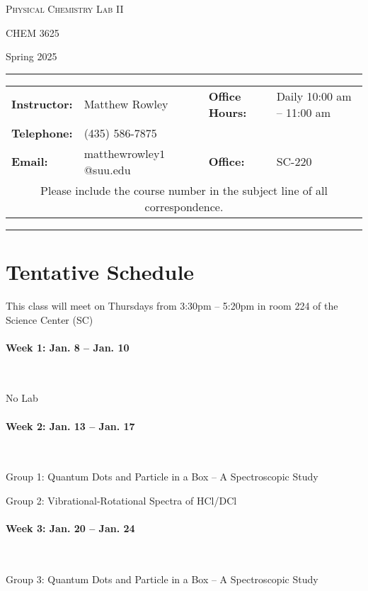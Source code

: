 \documentclass[12pt, letterpaper]{article}
\begin{document}
\begin{center}
	{\Large \textsc{Physical Chemistry Lab II}}

	CHEM 3625
\end{center}

\begin{center}
	{\large Spring 2025}
\end{center}
\begin{center}
	\rule{0.99\textwidth}{0.4pt}
	\begin{tabular}{llcll}
		\textbf{Instructor:} & Matthew Rowley           &  & \textbf{Office Hours:} & Daily 10:00 am -- 11:00 am \\
		\textbf{Telephone:}  & (435) 586-7875           &  &                        &                            \\
		\textbf{Email:}      & matthewrowley$1$@suu.edu &  & \textbf{Office:}       & SC-220                     \\
		\multicolumn{5}{c}{Please include the course number in the subject line of all correspondence.}
	\end{tabular}
	\rule{0.99\textwidth}{0.4pt}
\end{center}

\section*{Tentative Schedule}
This class will meet on Thursdays from 3:30pm -- 5:20pm in room 224 of the Science Center (SC)

\paragraph{Week 1: Jan. 8 -- Jan. 10}~

No Lab

\paragraph{Week 2: Jan. 13 -- Jan. 17}~

Group 1: Quantum Dots and Particle in a Box – A Spectroscopic Study

Group 2: Vibrational-Rotational Spectra of HCl/DCl
\paragraph{Week 3: Jan. 20 -- Jan. 24}~

Group 3: Quantum Dots and Particle in a Box – A Spectroscopic Study
\end{document}
